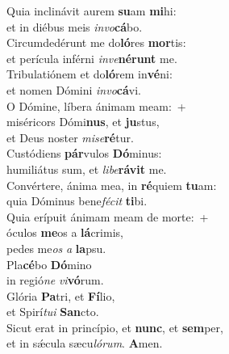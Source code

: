 \evenverse Quia inclinávit aurem \textbf{su}am \textbf{mi}hi:~\*\\
\evenverse et in diébus meis \textit{in}\textit{vo}\textbf{cá}bo.\\
\oddverse Circumdedérunt me do\textbf{ló}res \textbf{mor}tis:~\*\\
\oddverse et perícula inférni \textit{in}\textit{ve}\textbf{né}\textbf{runt} me.\\
\evenverse Tribulatiónem et do\textbf{ló}rem in\textbf{vé}ni:~\*\\
\evenverse et nomen Dómini \textit{in}\textit{vo}\textbf{cá}vi.\\
\oddverse O Dómine, líbera ánimam meam:~+\\
\oddverse  miséricors Dómi\textbf{nus}, et \textbf{ju}stus,~\*\\
\oddverse et Deus noster \textit{mi}\textit{se}\textbf{ré}tur.\\
\evenverse Custódiens \textbf{pár}vulos \textbf{Dó}minus:~\*\\
\evenverse humiliátus sum, et \textit{li}\textit{be}\textbf{rá}\textbf{vit} me.\\
\oddverse Convértere, ánima mea, in \textbf{ré}quiem \textbf{tu}am:~\*\\
\oddverse quia Dóminus bene\textit{fé}\textit{cit} \textbf{ti}bi.\\
\evenverse Quia erípuit ánimam meam de morte:~+\\
\evenverse  óculos \textbf{me}os a \textbf{lá}crimis,~\*\\
\evenverse pedes me\textit{os} \textit{a} \textbf{la}psu.\\
\oddverse Pla\textbf{cé}bo \textbf{Dó}mino~\*\\
\oddverse in regió\textit{ne} \textit{vi}\textbf{vó}rum.\\
\evenverse Glória \textbf{Pa}tri, et \textbf{Fí}lio,~\*\\
\evenverse et Spirí\textit{tu}\textit{i} \textbf{San}cto.\\
\oddverse Sicut erat in princípio, et \textbf{nunc}, et \textbf{sem}per,~\*\\
\oddverse et in sǽcula sæcu\textit{ló}\textit{rum}. \textbf{A}men.\\
